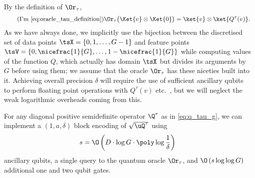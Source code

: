By the definition of $\Or_\tau$,
\begin{equation*}
  \tag{I'm \ref{eq:oracle_tau_definition}}
  \Or_\tau\big(\Ket{v}\otimes\Ket{0}\big)=\ket{v}\otimes\ket{Q^{\tau}(v)}.
\end{equation*}
As we have always done, we implicitly use the bijection between the discretised set of data points $\tsX=\{0,1,\ldots,G-1\}$ and feature points $\tsV=\{0,\nicefrac{1}{G},\ldots,1-\nicefrac{1}{G}\}$ while computing values of the function $Q$, which actually has domain $\tsX$ but divides its arguments by $G$ before using them; we assume that the oracle $\Or_\tau$ has these niceties built into it. Achieving overall precision $\delta$ will require the use of sufficient ancillary qubits to perform floating point operations with $Q^{\tau}(v)$ etc.\ , but we will neglect the weak logarithmic overheads coming from this. 

\begin{lemma}
  For any diagonal positive semidefinite operator $\Q^{\tau}$ as in \cref{eq:q_tau_g},
  we can implement a $\left(1,a,\delta\right)$ block encoding of $\sqrt{\uQ^{\tau}}$ using $$s=\O\left(D\cdot\log G\cdot \poly\log \frac{1}{\delta}\right)$$ ancillary qubits, a single query to the quantum oracle $\Or_\tau$, and $\O\left(s \log\log G\right)$ additional one and two qubit gates.
\end{lemma}

